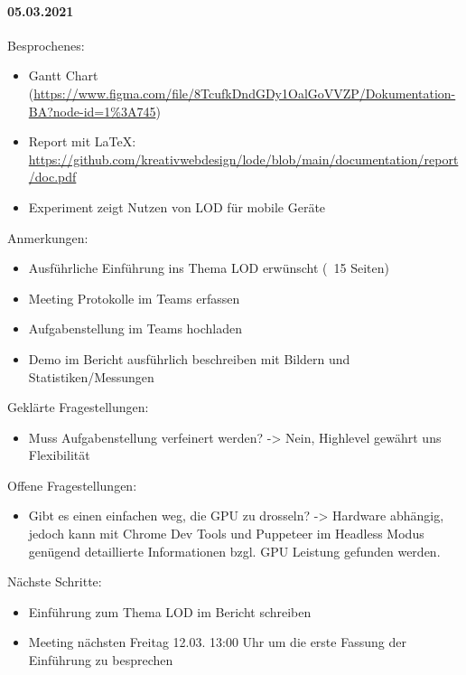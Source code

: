 \paragraph{05.03.2021}
Besprochenes:
\begin{itemize}
  \item Gantt Chart (\url{https://www.figma.com/file/8TcufkDndGDy1OalGoVVZP/Dokumentation-BA?node-id=1\%3A745})
  \item Report mit LaTeX: \url{https://github.com/kreativwebdesign/lode/blob/main/documentation/report/doc.pdf}
  \item Experiment zeigt Nutzen von LOD für mobile Geräte
\end{itemize}
Anmerkungen:
\begin{itemize}
  \item Ausführliche Einführung ins Thema LOD erwünscht (~15 Seiten)
  \item Meeting Protokolle im Teams erfassen
  \item Aufgabenstellung im Teams hochladen
  \item Demo im Bericht ausführlich beschreiben mit Bildern und Statistiken/Messungen
\end{itemize}
Geklärte Fragestellungen:
\begin{itemize}
  \item Muss Aufgabenstellung verfeinert werden? -> Nein, Highlevel gewährt uns Flexibilität
\end{itemize}
Offene Fragestellungen:
\begin{itemize}
  \item Gibt es einen einfachen weg, die GPU zu drosseln? -> Hardware abhängig, jedoch kann mit Chrome Dev Tools und Puppeteer im Headless Modus genügend detaillierte Informationen bzgl. GPU Leistung gefunden werden.
\end{itemize}
Nächste Schritte:
\begin{itemize}
  \item Einführung zum Thema LOD im Bericht schreiben
  \item Meeting nächsten Freitag 12.03. 13:00 Uhr um die erste Fassung der Einführung zu besprechen
\end{itemize}

\newpage

